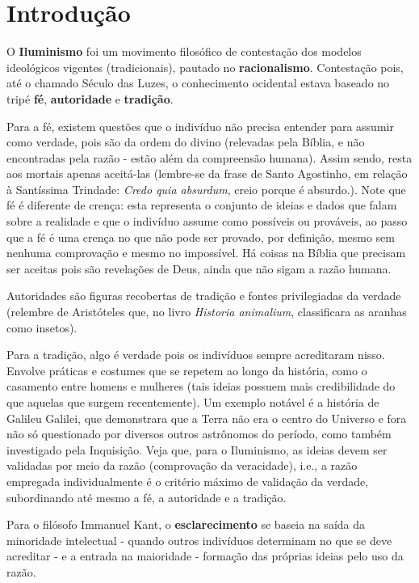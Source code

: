 \documentclass[12pt]{book}
\begin{document}
		\chapter{Introdução}
		\par O \textbf{Iluminismo} foi um movimento filosófico de contestação dos modelos ideológicos vigentes (tradicionais), pautado no \textbf{racionalismo}. Contestação pois, até o chamado Século das Luzes, o conhecimento ocidental estava baseado no tripé \textbf{fé}, \textbf{autoridade} e \textbf{tradição}.
		\par Para a fé, existem questões que o indivíduo não precisa entender para assumir como verdade, pois são da ordem do divino (relevadas pela Bíblia, e não encontradas pela razão - estão além da compreensão humana). Assim sendo, resta aos mortais apenas aceitá-las (lembre-se da frase de Santo Agostinho, em relação à Santíssima Trindade: \textit{Credo quia absurdum}, creio porque é absurdo.). Note que fé é diferente de crença: esta representa o conjunto de ideias e dados que falam sobre a realidade e que o indivíduo assume como possíveis ou prováveis, ao passo que a fé é uma crença no que não pode ser provado, por definição, mesmo sem nenhuma comprovação e mesmo no impossível. Há coisas na Bíblia que precisam ser aceitas pois são revelações de Deus, ainda que não sigam a razão humana.
		\par Autoridades são figuras recobertas de tradição e fontes privilegiadas da verdade (relembre de Aristóteles que, no livro \textit{Historia animalium}, classificara as aranhas como insetos).
		\par Para a tradição, algo é verdade pois os indivíduos sempre acreditaram nisso. Envolve práticas e costumes que se repetem ao longo da história, como o casamento entre homens e mulheres (tais ideias possuem mais credibilidade do que aquelas que surgem recentemente). Um exemplo notável é a história de Galileu Galilei, que demonstrara que a Terra não era o centro do Universo e fora não só questionado por diversos outros astrônomos do período, como também investigado pela Inquisição. Veja que, para o Iluminismo, as ideias devem ser validadas por meio da razão (comprovação da veracidade), i.e., a razão empregada individualmente é o critério máximo de validação da verdade, subordinando até mesmo a fé, a autoridade e a tradição.
		\par Para o filósofo Immanuel Kant, o \textbf{esclarecimento} se baseia na saída da minoridade intelectual - quando outros indivíduos determinam no que se deve acreditar - e a entrada na maioridade - formação das próprias ideias pelo uso da razão.
\end{document}
